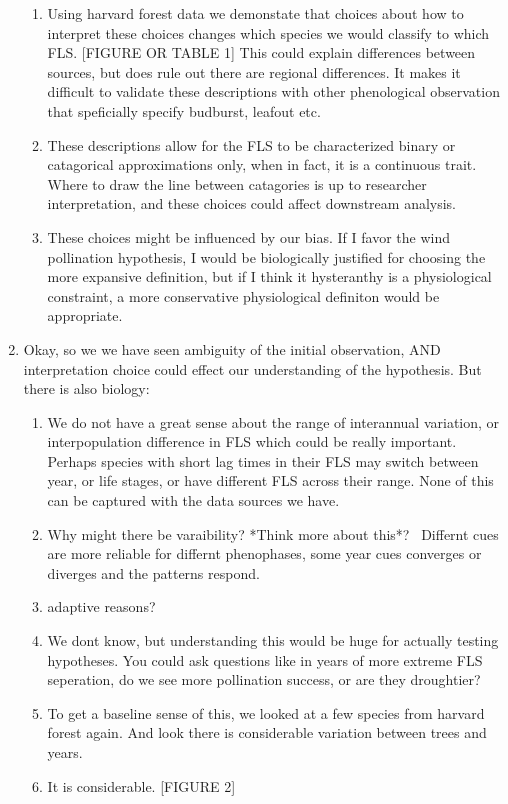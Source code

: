 \documentclass{article}
\begin{document}
\begin{enumerate}
\begin{enumerate}
\item Using harvard forest data we demonstate that choices about how to interpret these choices changes which species we would classify to which FLS. [FIGURE OR TABLE 1] This could explain differences between sources, but does rule out there are regional differences. It makes it difficult to validate these descriptions with other phenological observation that speficially specify budburst, leafout etc.
\item These descriptions allow for the FLS to be characterized binary or catagorical approximations only, when in fact, it is a continuous trait. Where to draw the line between catagories is up to researcher interpretation, and these choices could affect downstream analysis.
\item These choices might be influenced by our bias. If I favor the wind pollination hypothesis, I would be biologically justified for choosing the more expansive definition, but if I think it hysteranthy is a physiological constraint, a more conservative physiological definiton would be appropriate.
\end{enumerate}
\item Okay, so we we have seen ambiguity of the initial observation, AND interpretation choice could effect our understanding of the hypothesis. But there is also biology:
\begin{enumerate}
\item We do not have a great sense about the range of interannual variation, or interpopulation difference in FLS which could be really important. Perhaps species with short lag times in their FLS may switch between year, or life stages, or have different FLS across their range. None of this can be captured with the data sources we have.
\item Why might there be varaibility? *Think more about this*?
\ Differnt cues are more reliable for differnt phenophases, some year cues converges or diverges and the patterns respond.
\item adaptive reasons?
\item We dont know, but understanding this would be huge for actually testing hypotheses. You could ask questions like in years of more extreme FLS seperation, do we see more pollination success, or are they droughtier?
\item To get a baseline sense of this, we looked at a few species from harvard forest again. And look there is considerable variation between trees and years.
\item It is considerable. [FIGURE 2]

\end{enumerate}
\end{enumerate}
\end{document}
